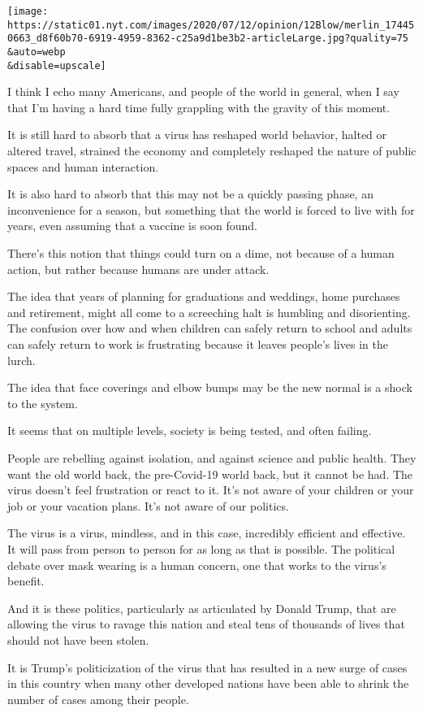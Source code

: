 \texttt{[image: https://static01.nyt.com/images/2020/07/12/opinion/12Blow/merlin\_174450663\_d8f60b70-6919-4959-8362-c25a9d1be3b2-articleLarge.jpg?quality=75\\\&auto=webp\\\&disable=upscale]}

I think I echo many Americans, and people of the world in general, when
I say that I'm having a hard time fully grappling with the gravity of
this moment.

It is still hard to absorb that a virus has reshaped world behavior,
halted or altered travel, strained the economy and completely reshaped
the nature of public spaces and human interaction.

It is also hard to absorb that this may not be a quickly passing phase,
an inconvenience for a season, but something that the world is forced to
live with for years, even assuming that a vaccine is soon found.

There's this notion that things could turn on a dime, not because of a
human action, but rather because humans are under attack.

The idea that years of planning for graduations and weddings, home
purchases and retirement, might all come to a screeching halt is
humbling and disorienting. The confusion over how and when children can
safely return to school and adults can safely return to work is
frustrating because it leaves people's lives in the lurch.

The idea that face coverings and elbow bumps may be the new normal is a
shock to the system.

It seems that on multiple levels, society is being tested, and often
failing.

People are rebelling against isolation, and against science and public
health. They want the old world back, the pre-Covid-19 world back, but
it cannot be had. The virus doesn't feel frustration or react to it.
It's not aware of your children or your job or your vacation plans. It's
not aware of our politics.

The virus is a virus, mindless, and in this case, incredibly efficient
and effective. It will pass from person to person for as long as that is
possible. The political debate over mask wearing is a human concern, one
that works to the virus's benefit.

And it is these politics, particularly as articulated by Donald Trump,
that are allowing the virus to ravage this nation and steal tens of
thousands of lives that should not have been stolen.

It is Trump's politicization of the virus that has resulted in a new
surge of cases in this country when many other developed nations have
been able to shrink the number of cases among their people.

